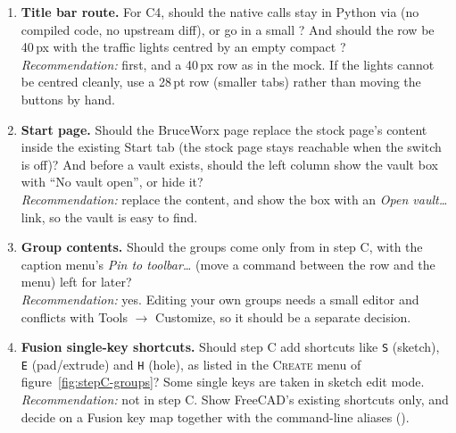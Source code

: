 \begin{enumerate}
        a separate Heuretes FreeCAD list that only hides it from the menu?\\
        \emph{Recommendation:} write the stock list. There is one truth, and start-up is faster.
  \item \textbf{Title bar route.} For C4, should the native calls stay in Python via  (no
        compiled code, no upstream diff), or go in a small ? And should the row be
        40\,px with the traffic lights centred by an empty compact ?\\
        \emph{Recommendation:}  first, and a 40\,px row as in the mock. If the lights cannot be
        centred cleanly, use a 28\,pt row (smaller tabs) rather than moving the buttons by hand.
  \item \textbf{Start page.} Should the BruceWorx page replace the stock page's content inside the existing
        Start tab (the stock page stays reachable when the switch is off)? And before a vault exists, should
        the left column show the vault box with ``No vault open'', or hide it?\\
        \emph{Recommendation:} replace the content, and show the box with an \emph{Open vault\ldots}
        link, so the vault is easy to find.
  \item \textbf{Group contents.} Should the groups come only from  in step C, with the
        caption menu's \emph{Pin to toolbar\ldots} (move a command between the row and the menu) left for
        later?\\
        \emph{Recommendation:} yes. Editing your own groups needs a small editor and conflicts with Tools
        $\rightarrow$ Customize, so it should be a separate decision.
  \item \textbf{Fusion single-key shortcuts.} Should step C add shortcuts like \texttt{S} (sketch),
        \texttt{E} (pad/extrude) and \texttt{H} (hole), as listed in the \textsc{Create} menu of
        figure~\ref{fig:stepC-groups}? Some single keys are taken in sketch edit mode.\\
        \emph{Recommendation:} not in step C. Show FreeCAD's existing shortcuts only, and decide on a Fusion
        key map together with the command-line aliases ().
\end{enumerate}
